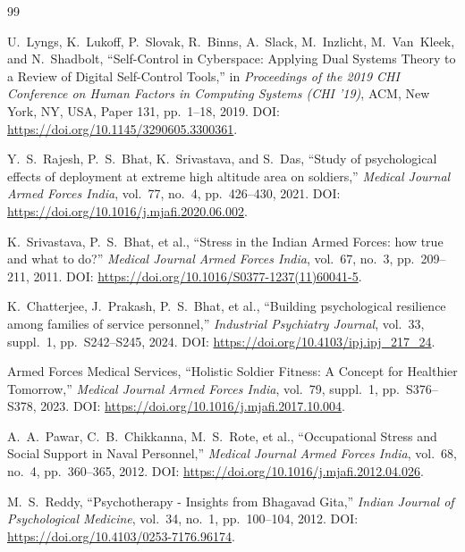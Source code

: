 \documentclass[11pt,a4paper]{article}
\begin{document}
\begin{thebibliography}{99}

U.~Lyngs, K.~Lukoff, P.~Slovak, R.~Binns, A.~Slack, M.~Inzlicht, M.~Van~Kleek, and N.~Shadbolt,
``Self-Control in Cyberspace: Applying Dual Systems Theory to a Review of Digital Self-Control Tools,''
in \textit{Proceedings of the 2019 CHI Conference on Human Factors in Computing Systems (CHI '19)},
ACM, New York, NY, USA, Paper 131, pp.~1--18, 2019. DOI: \url{https://doi.org/10.1145/3290605.3300361}.

Y.~S.~Rajesh, P.~S.~Bhat, K.~Srivastava, and S.~Das,
``Study of psychological effects of deployment at extreme high altitude area on soldiers,''
\textit{Medical Journal Armed Forces India}, vol.~77, no.~4, pp.~426--430, 2021. DOI: \url{https://doi.org/10.1016/j.mjafi.2020.06.002}.

K.~Srivastava, P.~S.~Bhat, et al.,
``Stress in the Indian Armed Forces: how true and what to do?''
\textit{Medical Journal Armed Forces India}, vol.~67, no.~3, pp.~209--211, 2011. DOI: \url{https://doi.org/10.1016/S0377-1237(11)60041-5}.

K.~Chatterjee, J.~Prakash, P.~S.~Bhat, et al.,
``Building psychological resilience among families of service personnel,''
\textit{Industrial Psychiatry Journal}, vol.~33, suppl.~1, pp.~S242--S245, 2024. DOI: \url{https://doi.org/10.4103/ipj.ipj_217_24}.

Armed Forces Medical Services,
``Holistic Soldier Fitness: A Concept for Healthier Tomorrow,''
\textit{Medical Journal Armed Forces India}, vol.~79, suppl.~1, pp.~S376--S378, 2023. DOI: \url{https://doi.org/10.1016/j.mjafi.2017.10.004}.

A.~A.~Pawar, C.~B.~Chikkanna, M.~S.~Rote, et al.,
``Occupational Stress and Social Support in Naval Personnel,''
\textit{Medical Journal Armed Forces India}, vol.~68, no.~4, pp.~360--365, 2012. DOI: \url{https://doi.org/10.1016/j.mjafi.2012.04.026}.

M.~S.~Reddy,
``Psychotherapy - Insights from Bhagavad Gita,''
\textit{Indian Journal of Psychological Medicine}, vol.~34, no.~1, pp.~100--104, 2012. DOI: \url{https://doi.org/10.4103/0253-7176.96174}.


\end{thebibliography}
\end{document}
